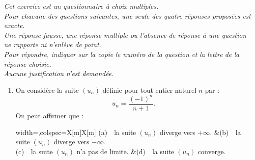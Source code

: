 \emph{Cet exercice est un questionnaire à choix multiples.\\
	Pour chacune des questions suivantes, une seule des quatre réponses proposées est exacte.\\
	Une réponse fausse, une réponse multiple ou l'absence de réponse à une question ne rapporte ni n'enlève de point.\\
	Pour répondre, indiquer sur la copie le numéro de la question et la lettre de la réponse choisie.\\
	Aucune justification n'est demandée.}

\medskip

\begin{enumerate}
	\item On considère la suite $\left(u_n\right)$ définie pour tout entier naturel $n$ par :\[u_n  = \dfrac{(- 1)^n}{n + 1}.\]
	On peut affirmer que :
	
	\smallskip
	
	\begin{tblr}{width=\linewidth,colspec={X[m]X[m]}}
		(a)~~la suite $\left(u_n\right)$ diverge vers $+\infty$. &(b)~~la suite $\left(u_n\right)$ diverge vers $-\infty$.\\
		(c)~~la suite $\left(u_n\right)$ n'a pas de limite. &(d)~~la suite $\left(u_n\right)$ converge.
	\end{tblr}
	
	\begin{center} \decosix \decosix \decosix  \end{center}
\end{enumerate}

